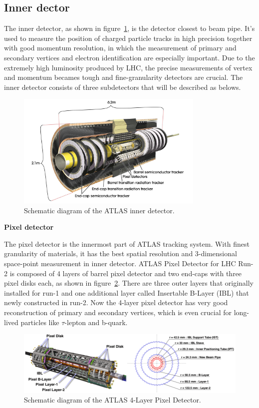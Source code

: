 \subsection{Inner dector}

The inner detector, as shown in figure~\ref{fig:inner_dec}, is the detector closest to beam pipe.
It's used to measure the position of charged particle tracks in high precision together with good momentum resolution,
in which the measurement of primary and secondary vertices and electron identification are especially important.
Due to the extremely high luminosity produced by LHC, the precise measurements of vertex and momentum becames tough and fine-granularity detectors are crucial.
The inner detector consists of three subdetectors that will be described as belows.
\begin{figure}[!htb]
  \centering
  \includegraphics[width=0.8\textwidth]{figures/Detector/ID_newTRT_d3.png}
  \caption{Schematic diagram of the ATLAS inner detector\cite{Aad:1698966}.}
  \label{fig:inner_dec}
\end{figure}

\textbf{Pixel detector}

The pixel detector is the innermost part of ATLAS tracking system.
With finest granularity of materials, it has the best spatial resolution and 3-dimensional space-point measurement in inner detector.
ATLAS Pixel Detector for LHC Run-2 is composed of 4 layers of barrel pixel detector and two end-caps with three pixel disks each, as shown in figure~\ref{fig:inner_pixel}.
There are three outer layers that originally installed for run-1 and one additional layer called Insertable B-Layer (IBL) that newly constructed in run-2\cite{Mullier:2016}.
Now the 4-layer pixel detector has very good reconstruction of primary and secondary vertices, which is even crucial for long-lived particles like $\tau$-lepton and b-quark.
\begin{figure}[!htb]
  \centering
  \includegraphics[width=1.0\textwidth]{figures/Detector/inner_pixel.png}
  \caption{Schematic diagram of the ATLAS 4-Layer Pixel Detector.}
  \label{fig:inner_pixel}
\end{figure}

